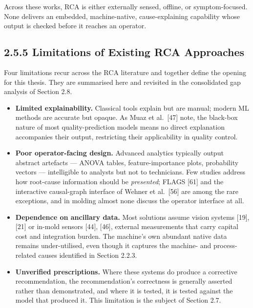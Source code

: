 Across these works, RCA is either externally sensed, offline, or symptom-focused. None delivers an embedded, machine-native, cause-explaining capability whose output is checked before it reaches an operator.

\hypertarget{limitations-of-existing-rca-approaches}{%
\subsection{2.5.5 Limitations of Existing RCA Approaches}\label{limitations-of-existing-rca-approaches}}

Four limitations recur across the RCA literature and together define the opening for this thesis. They are summarised here and revisited in the consolidated gap analysis of Section 2.8.

\begin{itemize}
\tightlist
\item
  \textbf{Limited explainability.} Classical tools explain but are manual; modern ML methods are accurate but opaque. As Muaz et al.~{[}47{]} note, the black-box nature of most quality-prediction models means no direct explanation accompanies their output, restricting their applicability in quality control.
\item
  \textbf{Poor operator-facing design.} Advanced analytics typically output abstract artefacts --- ANOVA tables, feature-importance plots, probability vectors --- intelligible to analysts but not to technicians. Few studies address how root-cause information should be \emph{presented}; FLAGS {[}61{]} and the interactive causal-graph interface of Wehner et al.~{[}56{]} are among the rare exceptions, and in molding almost none discuss the operator interface at all.
\item
  \textbf{Dependence on ancillary data.} Most solutions assume vision systems {[}19{]}, {[}21{]} or in-mold sensors {[}44{]}, {[}46{]}, external measurements that carry capital cost and integration burden. The machine's own abundant native data remains under-utilised, even though it captures the machine- and process-related causes identified in Section 2.2.3.
\item
  \textbf{Unverified prescriptions.} Where these systems do produce a corrective recommendation, the recommendation's correctness is generally asserted rather than demonstrated, and where it is tested, it is tested against the model that produced it. This limitation is the subject of Section 2.7.
\end{itemize}

